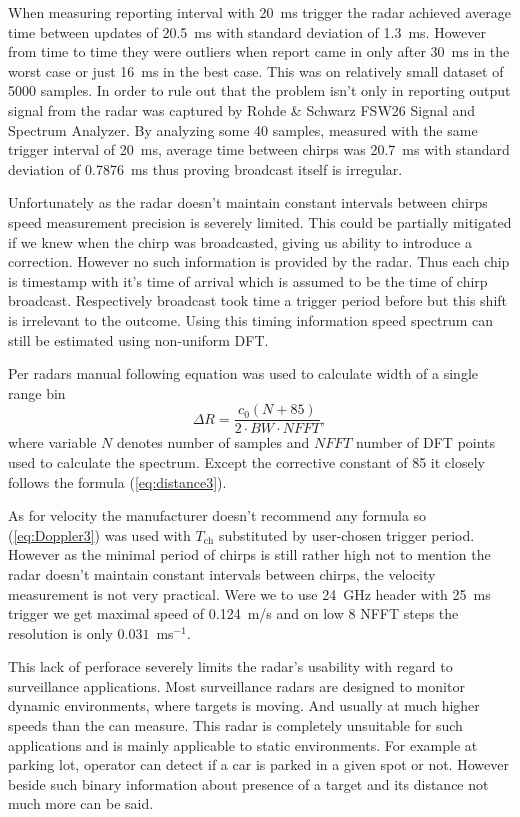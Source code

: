 When measuring reporting interval with 20~ms trigger the radar achieved average time between updates of 20.5~ms with standard deviation of 1.3~ms.
However from time to time they were outliers when report came in only after 30~ms in the worst case or just 16~ms in the best case.
This was on relatively small dataset of 5000 samples.
In order to rule out that the problem isn't only in reporting output signal from the radar was captured by Rohde \& Schwarz FSW26 Signal and Spectrum Analyzer.
By analyzing some 40 samples, measured with the same trigger interval of 20~ms, average time between chirps was 20.7~ms with standard deviation of 0.7876~ms thus proving broadcast itself is irregular.

Unfortunately as the radar doesn't maintain constant intervals between chirps speed measurement precision is severely limited.
This could be partially mitigated if we knew when the chirp was broadcasted, giving us ability to introduce a correction.
However no such information is provided by the radar.
Thus each chip is timestamp with it's time of arrival which is assumed to be the time of chirp broadcast.
Respectively broadcast took time a trigger period before but this shift is irrelevant to the outcome.
Using this timing information speed spectrum can still be estimated using non-uniform DFT.

Per radars manual \cite{sidarPRO} following equation was used to calculate width of a single range bin
\begin{equation}
  \Delta R = \frac{c_0 (N+85)}{2\cdot BW\cdot NFFT},
  \label{eq:rangeBin}
\end{equation}
where variable $N$ denotes number of samples and $NFFT$ number of DFT points used to calculate the spectrum.
Except the corrective constant of 85 it closely follows the formula (\ref{eq:distance3}).

As for velocity the manufacturer doesn't recommend any formula so (\ref{eq:Doppler3}) was used with $T_\mathrm{ch}$ substituted by user-chosen trigger period.
However as the minimal period of chirps is still rather high not to mention the radar doesn't maintain constant intervals between chirps, the velocity measurement is not very practical.
Were we to use 24~GHz header with 25~ms trigger we get maximal speed of 0.124~m/s and on low 8 NFFT steps the resolution is only $0.031$~ms$^{-1}$.

This lack of perforace severely limits the radar's usability with regard to surveillance applications.
Most surveillance radars are designed to monitor dynamic environments, where targets is moving.
And usually at much higher speeds than the \sidar can measure.
This radar is completely unsuitable for such applications and is mainly applicable to static environments.
For example at parking lot, operator can detect if a car is parked in a given spot or not.
However beside such binary information about presence of a target and its distance not much more can be said.

